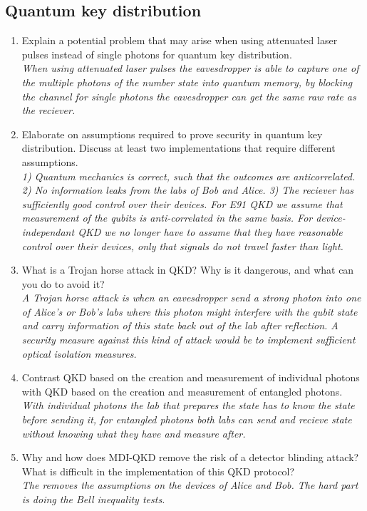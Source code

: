 \documentclass[a4paper]{scrartcl}
\newcommand{\qa}[2]{#1\\ \textit{#2}}
\begin{document}
\subsection*{Quantum key distribution}
\begin{enumerate}[label=(\alph*)]
  \item \qa{Explain a potential problem that may arise when using attenuated laser pulses instead of single photons for quantum key distribution.}{When using attenuated laser pulses the eavesdropper is able to capture one of the multiple photons of the number state into quantum memory, by blocking the channel for single photons the eavesdropper can get the same raw rate as the reciever.}
  \item \qa{Elaborate on assumptions required to prove security in quantum key distribution. Discuss at least two implementations that require different assumptions.}{1) Quantum mechanics is correct, such that the outcomes are anticorrelated. 2) No information leaks from the labs of Bob and Alice. 3) The reciever has sufficiently good control over their devices. For E91 QKD we assume that measurement of the qubits is anti-correlated in the same basis. For device-independant QKD we no longer have to assume that they have reasonable control over their devices, only that signals do not travel faster than light.}
  \item \qa{What is a Trojan horse attack in QKD? Why is it dangerous, and what can you do to avoid it?}{A Trojan horse attack is when an eavesdropper send a strong photon into one of Alice's or Bob's labs where this photon might interfere with the qubit state and carry information of this state back out of the lab after reflection. A security measure against this kind of attack would be to implement sufficient optical isolation measures.}
  \item \qa{Contrast QKD based on the creation and measurement of individual photons with QKD based on the creation and measurement of entangled photons.}{With individual photons the lab that prepares the state has to know the state before sending it, for entangled photons both labs can send and recieve state without knowing what they have and measure after.}
  \item \qa{Why and how does MDI-QKD remove the risk of a detector blinding attack? What is difficult in the implementation of this QKD protocol?}{The removes the assumptions on the devices of Alice and Bob. The hard part is doing the Bell inequality tests.}
\end{enumerate}
\end{document}
